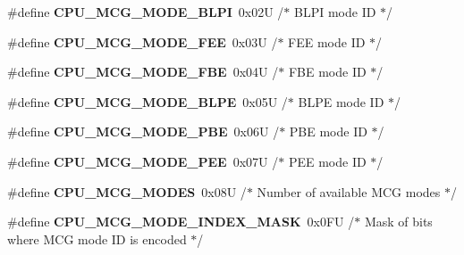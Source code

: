 \begin{DoxyCompactItemize}
\item 
\#define {\bfseries C\+P\+U\+\_\+\+M\+C\+G\+\_\+\+M\+O\+D\+E\+\_\+\+B\+L\+PI}~0x02\+U     /$\ast$ B\+L\+P\+I mode I\+D $\ast$/\hypertarget{group___c_p_u___config__module_gab135ea0336f6f3a4ad3c92b55c18225e}{}\label{group___c_p_u___config__module_gab135ea0336f6f3a4ad3c92b55c18225e}

\item 
\#define {\bfseries C\+P\+U\+\_\+\+M\+C\+G\+\_\+\+M\+O\+D\+E\+\_\+\+F\+EE}~0x03\+U     /$\ast$ F\+E\+E mode I\+D $\ast$/\hypertarget{group___c_p_u___config__module_ga642cd68e79b7e750315f1d6e5bb34348}{}\label{group___c_p_u___config__module_ga642cd68e79b7e750315f1d6e5bb34348}

\item 
\#define {\bfseries C\+P\+U\+\_\+\+M\+C\+G\+\_\+\+M\+O\+D\+E\+\_\+\+F\+BE}~0x04\+U     /$\ast$ F\+B\+E mode I\+D $\ast$/\hypertarget{group___c_p_u___config__module_ga4991845ddf66edec794226792f11a42d}{}\label{group___c_p_u___config__module_ga4991845ddf66edec794226792f11a42d}

\item 
\#define {\bfseries C\+P\+U\+\_\+\+M\+C\+G\+\_\+\+M\+O\+D\+E\+\_\+\+B\+L\+PE}~0x05\+U     /$\ast$ B\+L\+P\+E mode I\+D $\ast$/\hypertarget{group___c_p_u___config__module_ga6f9bf3500498a480cec52cb52a3fabe1}{}\label{group___c_p_u___config__module_ga6f9bf3500498a480cec52cb52a3fabe1}

\item 
\#define {\bfseries C\+P\+U\+\_\+\+M\+C\+G\+\_\+\+M\+O\+D\+E\+\_\+\+P\+BE}~0x06\+U     /$\ast$ P\+B\+E mode I\+D $\ast$/\hypertarget{group___c_p_u___config__module_ga9ac51baf003f6eecf6c5a6309922a33c}{}\label{group___c_p_u___config__module_ga9ac51baf003f6eecf6c5a6309922a33c}

\item 
\#define {\bfseries C\+P\+U\+\_\+\+M\+C\+G\+\_\+\+M\+O\+D\+E\+\_\+\+P\+EE}~0x07\+U     /$\ast$ P\+E\+E mode I\+D $\ast$/\hypertarget{group___c_p_u___config__module_gaae96c17ee5fde25aa26cebfff0f8b055}{}\label{group___c_p_u___config__module_gaae96c17ee5fde25aa26cebfff0f8b055}

\item 
\#define {\bfseries C\+P\+U\+\_\+\+M\+C\+G\+\_\+\+M\+O\+D\+ES}~0x08\+U     /$\ast$ Number of available M\+C\+G modes $\ast$/\hypertarget{group___c_p_u___config__module_ga72e3a814e09412ada1a89c322086fb75}{}\label{group___c_p_u___config__module_ga72e3a814e09412ada1a89c322086fb75}

\item 
\#define {\bfseries C\+P\+U\+\_\+\+M\+C\+G\+\_\+\+M\+O\+D\+E\+\_\+\+I\+N\+D\+E\+X\+\_\+\+M\+A\+SK}~0x0\+F\+U     /$\ast$ Mask of bits where M\+C\+G mode I\+D is encoded $\ast$/\hypertarget{group___c_p_u___config__module_gad9575d3cdabd764bf84fe505fc633dd3}{}\label{group___c_p_u___config__module_gad9575d3cdabd764bf84fe505fc633dd3}


\end{DoxyCompactItemize}
